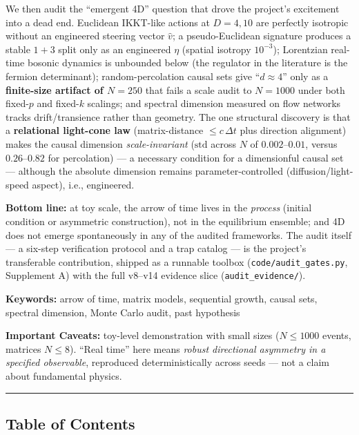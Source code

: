 We then audit the ``emergent 4D'' question that drove the project's
excitement into a dead end. Euclidean IKKT-like actions at \(D=4,10\)
are perfectly isotropic without an engineered steering vector
\(\hat v\); a pseudo-Euclidean signature produces a stable \(1{+}3\)
split only as an engineered \(\eta\) (spatial isotropy \(10^{-3}\));
Lorentzian real-time bosonic dynamics is unbounded below (the regulator
in the literature is the fermion determinant); random-percolation causal
sets give ``\(d\approx4\)'' only as a \textbf{finite-size artifact of
\(N=250\)} that fails a scale audit to \(N=1000\) under both fixed-\(p\)
and fixed-\(k\) scalings; and spectral dimension measured on flow
networks tracks drift/transience rather than geometry. The one
structural discovery is that a \textbf{relational light-cone law}
(matrix-distance \(\le c\,\Delta t\) plus direction alignment) makes the
causal dimension \emph{scale-invariant} (\(\mathrm{std}\) across \(N\)
of \(0.002\)--\(0.01\), versus \(0.26\)--\(0.82\) for percolation) --- a
necessary condition for a dimensionful causal set --- although the
absolute dimension remains parameter-controlled (diffusion/light-speed
aspect), i.e., engineered.

\textbf{Bottom line:} at toy scale, the arrow of time lives in the
\emph{process} (initial condition or asymmetric construction), not in
the equilibrium ensemble; and 4D does not emerge spontaneously in any of
the audited frameworks. The audit itself --- a six-step verification
protocol and a trap catalog --- is the project's transferable
contribution, shipped as a runnable toolbox
(\texttt{code/audit\_gates.py}, Supplement A) with the full v8--v14
evidence slice (\texttt{audit\_evidence/}).

\textbf{Keywords:} arrow of time, matrix models, sequential growth,
causal sets, spectral dimension, Monte Carlo audit, past hypothesis

\textbf{Important Caveats:} toy-level demonstration with small sizes
(\(N\le 1000\) events, matrices \(N\le 8\)). ``Real time'' here means
\emph{robust directional asymmetry in a specified observable},
reproduced deterministically across seeds --- not a claim about
fundamental physics.

\begin{center}\rule{0.5\linewidth}{0.5pt}\end{center}

\subsection{Table of Contents}\label{table-of-contents}

